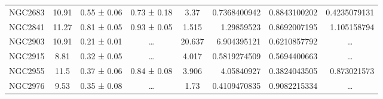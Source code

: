 \documentclass[reprint,%
 amsmath,amssymb,
 aps,
]{revtex4-1}
\begin{document}
\begin{table}[]
\begin{tabular}{cccccrrc}
\rowcolor[HTML]{F3F3F3} 
NGC2683              & 10.91                     & 0.55 ± 0.06           & 0.73 ± 0.18            & 3.37                                                         & 0.7368400942                                                          & 0.8843100202                                                          & \multicolumn{1}{r}{\cellcolor[HTML]{F3F3F3}0.4235079131}      \\
\rowcolor[HTML]{F3F3F3} 
NGC2841              & 11.27                     & 0.81 ± 0.05           & 0.93 ± 0.05            & 1.515                                                        & 1.29859523                                                            & 0.8692007195                                                          & \multicolumn{1}{r}{\cellcolor[HTML]{F3F3F3}1.105158794}       \\
\rowcolor[HTML]{F3F3F3} 
NGC2903              & 10.91                     & 0.21 ± 0.01           & …                      & 20.637                                                       & 6.904395121                                                           & 0.6210857792                                                          & …                                                             \\
\rowcolor[HTML]{F3F3F3} 
NGC2915              & 8.81                      & 0.32 ± 0.05           & …                      & 4.017                                                        & 0.5819274509                                                          & 0.5694400663                                                          & …                                                             \\
\rowcolor[HTML]{F3F3F3} 
NGC2955              & 11.5                      & 0.37 ± 0.06           & 0.84 ± 0.08            & 3.906                                                        & 4.05840927                                                            & 0.3824043505                                                          & \multicolumn{1}{r}{\cellcolor[HTML]{F3F3F3}0.873021573}       \\
\rowcolor[HTML]{F3F3F3} 
NGC2976              & 9.53                      & 0.35 ± 0.08           & …                      & 1.73                                                         & 0.4109470835                                                          & 0.9082215334                                                          & …                                                             \\

\end{tabular}
\end{table}
\end{document}
